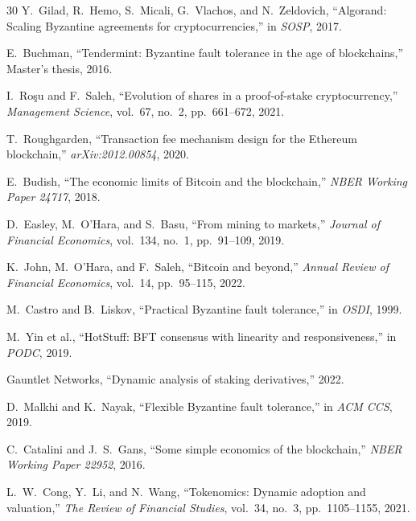 \begin{thebibliography}{30}
Y.~Gilad, R.~Hemo, S.~Micali, G.~Vlachos, and N.~Zeldovich, ``Algorand: Scaling Byzantine agreements for cryptocurrencies,'' in \emph{SOSP}, 2017.

E.~Buchman, ``Tendermint: Byzantine fault tolerance in the age of blockchains,'' Master's thesis, 2016.

I.~Ro\c{s}u and F.~Saleh, ``Evolution of shares in a proof-of-stake cryptocurrency,'' \emph{Management Science}, vol.~67, no.~2, pp.~661--672, 2021.

T.~Roughgarden, ``Transaction fee mechanism design for the Ethereum blockchain,'' \emph{arXiv:2012.00854}, 2020.

E.~Budish, ``The economic limits of Bitcoin and the blockchain,'' \emph{NBER Working Paper 24717}, 2018.

D.~Easley, M.~O'Hara, and S.~Basu, ``From mining to markets,'' \emph{Journal of Financial Economics}, vol.~134, no.~1, pp.~91--109, 2019.

K.~John, M.~O'Hara, and F.~Saleh, ``Bitcoin and beyond,'' \emph{Annual Review of Financial Economics}, vol.~14, pp.~95--115, 2022.

M.~Castro and B.~Liskov, ``Practical Byzantine fault tolerance,'' in \emph{OSDI}, 1999.

M.~Yin et al., ``HotStuff: BFT consensus with linearity and responsiveness,'' in \emph{PODC}, 2019.

Gauntlet Networks, ``Dynamic analysis of staking derivatives,'' 2022.

D.~Malkhi and K.~Nayak, ``Flexible Byzantine fault tolerance,'' in \emph{ACM CCS}, 2019.

C.~Catalini and J.~S.~Gans, ``Some simple economics of the blockchain,'' \emph{NBER Working Paper 22952}, 2016.

L.~W.~Cong, Y.~Li, and N.~Wang, ``Tokenomics: Dynamic adoption and valuation,'' \emph{The Review of Financial Studies}, vol.~34, no.~3, pp.~1105--1155, 2021.

\end{thebibliography}

